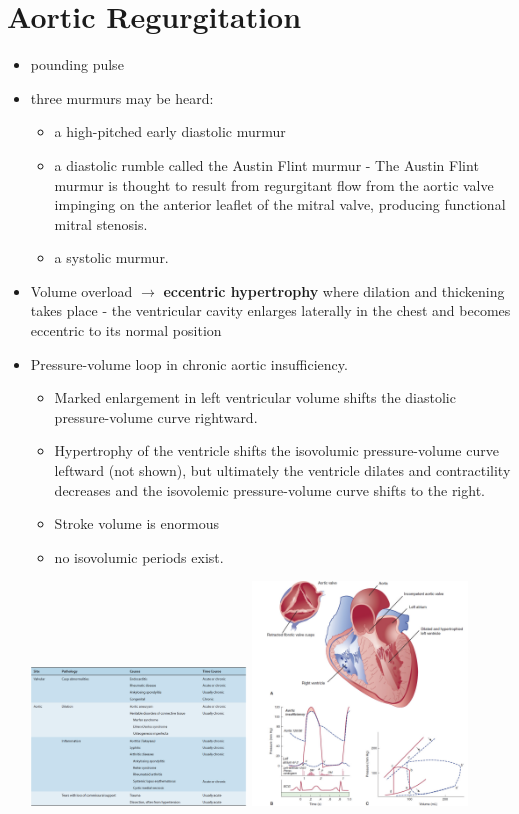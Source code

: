 \documentclass[11pt]{article}
\begin{document}
\section{Aortic Regurgitation}
\label{sec:AorticRegurgitation}
\begin{itemize}
\item pounding pulse
\item three murmurs may be heard:
  \begin{itemize}
  \item a high-pitched early diastolic murmur
  \item a diastolic rumble called the Austin Flint murmur - The Austin Flint murmur is thought to result from regurgitant flow from the aortic valve impinging on the anterior leaflet of the mitral valve, producing functional mitral stenosis.
  \item a systolic murmur.
  \end{itemize}

\item Volume overload $\rightarrow$ \textbf{eccentric hypertrophy} where dilation and thickening takes place - the ventricular cavity enlarges laterally in the chest and becomes eccentric to its normal position
\item Pressure-volume loop in chronic aortic insufficiency.
  \begin{itemize}
  \item Marked enlargement in left ventricular volume shifts the
    diastolic pressure-volume curve rightward. 
  \item Hypertrophy of the
    ventricle shifts the isovolumic pressure-volume curve leftward
    (not shown), but ultimately the ventricle dilates and
    contractility decreases and the isovolemic pressure-volume curve
    shifts to the right. 
  \item Stroke volume is enormous
  \item no isovolumic periods exist.
\end{itemize}

\includegraphics[width=0.45\textwidth]{images/causes_of_aortic_insufficiency.png}
\includegraphics[width=0.45\textwidth]{images/characteristics_of_aortic_insufficiency.png}
\end{itemize}
\end{document}
